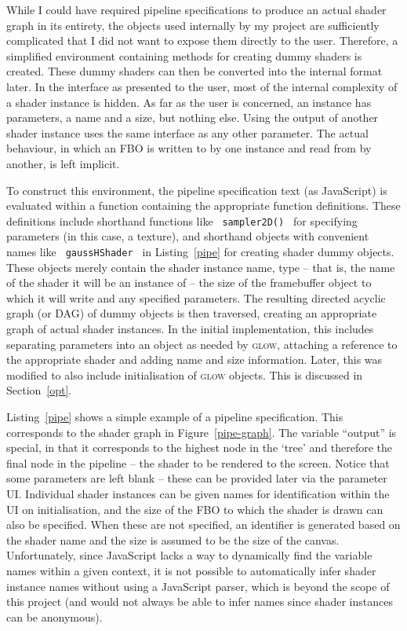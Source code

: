 \documentclass[12pt,twoside,notitlepage]{report}
\begin{document}
While I could have required pipeline specifications to produce an actual shader graph in its entirety, the objects used internally by my project are sufficiently complicated that I did not want to expose them directly to the user. Therefore, a simplified environment containing methods for creating dummy shaders is created. These dummy shaders can then be converted into the internal format later. In the interface as presented to the user, most of the internal complexity of a shader instance is hidden. As far as the user is concerned, an instance has parameters, a name and a size, but nothing else. Using the output of another shader instance uses the same interface as any other parameter. The actual behaviour, in which an FBO is written to by one instance and read from by another, is left implicit.

To construct this environment, the pipeline specification text (as JavaScript) is evaluated within a function containing the appropriate function definitions. These definitions include shorthand functions like \texttt{ sampler2D() } for specifying parameters (in this case, a texture), and shorthand objects with convenient names like \texttt{ gaussHShader } in Listing~\ref{pipe} for creating shader dummy objects. These objects merely contain the shader instance name, type -- that is, the name of the shader it will be an instance of -- the size of the framebuffer object to which it will write and any specified parameters. The resulting directed acyclic graph (or DAG) of dummy objects is then traversed, creating an appropriate graph of actual shader instances. In the initial implementation, this includes separating parameters into an object as needed by \textsc{glow}, attaching a reference to the appropriate shader and adding name and size information. Later, this was modified to also include initialisation of \textsc{glow} objects. This is discussed in Section~\ref{opt}.

Listing~\ref{pipe} shows a simple example of a pipeline specification. This corresponds to the shader graph in Figure~\ref{pipe-graph}. The variable ``output'' is special, in that it corresponds to the highest node in the `tree' and therefore the final node in the pipeline -- the shader to be rendered to the screen. Notice that some parameters are left blank -- these can be provided later via the parameter UI. Individual shader instances can be given names for identification within the UI on initialisation, and the size of the FBO to which the shader is drawn can also be specified. When these are not specified, an identifier is generated based on the shader name and the size is assumed to be the size of the canvas. Unfortunately, since JavaScript lacks a way to dynamically find the variable names within a given context, it is not possible to automatically infer shader instance names without using a JavaScript parser, which is beyond the scope of this project (and would not always be able to infer names since shader instances can be anonymous).
\end{document}
